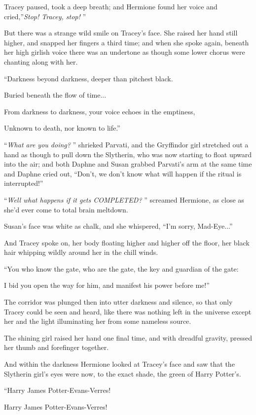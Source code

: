 Tracey paused, took a deep breath; and Hermione found her voice and
cried,''\emph{Stop! Tracey, stop!} ''

But there was a strange wild smile on Tracey's face. She raised her hand
still higher, and snapped her fingers a third time; and when she spoke
again, beneath her high girlish voice there was an undertone as though
some lower chorus were chanting along with her.

``Darkness beyond darkness, deeper than pitchest black.

Buried beneath the flow of time...

From darkness to darkness, your voice echoes in the emptiness,

Unknown to death, nor known to life.''

``\emph{What are you doing?} '' shrieked Parvati, and the Gryffindor girl
stretched out a hand as though to pull down the Slytherin, who was now
starting to float upward into the air; and both Daphne and Susan grabbed
Parvati's arm at the same time and Daphne cried out, ``Don't, we don't
know what will happen if the ritual is interrupted!''

``\emph{Well what happens if it gets COMPLETED?} '' screamed Hermione, as
close as she'd ever come to total brain meltdown.

Susan's face was white as chalk, and she whispered, ``I'm sorry,
Mad-Eye...''

And Tracey spoke on, her body floating higher and higher off the floor,
her black hair whipping wildly around her in the chill winds.

``You who know the gate, who are the gate, the key and guardian of the
gate:

I bid you open the way for him, and manifest his power before me!''

The corridor was plunged then into utter darkness and silence, so that
only Tracey could be seen and heard, like there was nothing left in the
universe except her and the light illuminating her from some nameless
source.

The shining girl raised her hand one final time, and with dreadful
gravity, pressed her thumb and forefinger together.

And within the darkness Hermione looked at Tracey's face and saw that
the Slytherin girl's eyes were now, to the exact shade, the green of
Harry Potter's.

``Harry James Potter-Evans-Verres!

Harry James Potter-Evans-Verres!

